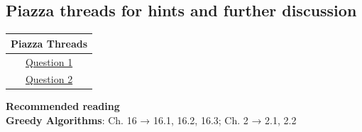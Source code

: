 \documentclass[12pt]{article}
\begin{document}
\hrulefill
\pagebreak

\subsection*{Piazza threads for hints and further discussion}
\begin{center}
    \begin{tabular}{|c|}
    \hline
    Piazza Threads \\ [0.5ex] 
    \hline \hline 
    \href{https://piazza.com/class/ka2roz7rb9m3j4?cid=47}{Question 1}\\
    \href{https://piazza.com/class/ka2roz7rb9m3j4?cid=48}{Question 2}\\
    \hline
    \end{tabular}
\end{center}

\textbf{Recommended reading} \\ 
\textbf{Greedy Algorithms}: Ch. 16 →  16.1, 16.2, 16.3; Ch. 2 →  2.1, 2.2

\pagebreak
\end{document}
